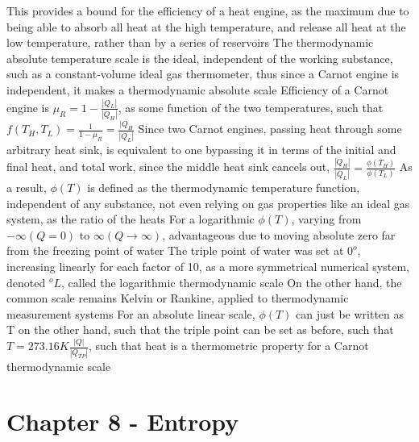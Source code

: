 \documentclass[11 pt, twoside]{article}
\newenvironment{outline*}
{
	\begin{outline}[enumerate]
	}
	{\end{outline}
}
\begin{document}
\begin{outline*}
\3 This provides a bound for the efficiency of a heat engine, as the maximum due to being able to absorb all heat at the high temperature, and release all heat at the low temperature, rather than by a series of reservoirs
\1 The thermodynamic absolute temperature scale is the ideal, independent of the working substance, such as a constant-volume ideal gas thermometer, thus since a Carnot engine is independent, it makes a thermodynamic absolute scale
\2 Efficiency of a Carnot engine is $\mu_R = 1 - \frac{|Q_L|}{|Q_H|}$, as some function of the two temperatures, such that $f(T_H, T_L) = \frac{1}{1 - \mu_R} = \frac{|Q_H}{|Q_L|}$
\2 Since two Carnot engines, passing heat through some arbitrary heat sink, is equivalent to one bypassing it in terms of the initial and final heat, and total work, since the middle heat sink cancels out, $\frac{|Q_H|}{|Q_L|} = \frac{\phi(T_H)}{\phi(T_L)}$
\2 As a result, $\phi(T)$ is defined as the thermodynamic temperature function, independent of any substance, not even relying on gas properties like an ideal gas system, as the ratio of the heats
\3 For a logarithmic $\phi(T)$, varying from $-\infty (Q = 0)$ to $\infty (Q \to \infty)$, advantageous due to moving absolute zero far from the freezing point of water
\4 The triple point of water was set at $0^o$, increasing linearly for each factor of 10, as a more symmetrical numerical system, denoted $^oL$, called the logarithmic thermodynamic scale
\3 On the other hand, the common scale remains Kelvin or Rankine, applied to thermodynamic measurement systems
\2 For an absolute linear scale, $\phi(T)$ can just be written as T on the other hand, such that the triple point can be set as before, such that $T = 273.16 K \frac{|Q|}{|Q_{TP}|}$, such that heat is a thermometric property for a Carnot thermodynamic scale
\end{outline*}
\section{Chapter 8 - Entropy}
\end{document}
